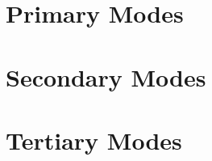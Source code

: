 \documentclass[12pt]{report}
\begin{document}
\part{Primary Modes} \label{Primary Modes}




\part{Secondary Modes} \label{Secondary Modes}



\part{Tertiary Modes} \label{Tertiary Modes}






\end{document}
